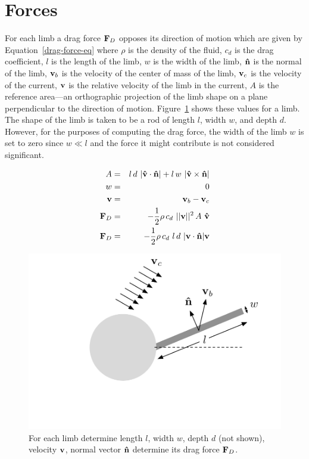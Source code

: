 \section{Forces}

For each limb a drag force $\mathbf{F}_D$ opposes its direction of motion
which are given by Equation~\ref{drag-force-eq} where $\rho$ is the
density of the fluid, $c_d$ is the drag coefficient, $l$ is the length
of the limb, $w$ is the width of the limb, $\mathbf{\hat{n}}$ is the normal of
the limb, $\mathbf{v}_b$ is the velocity of the center of mass of the limb,
$\mathbf{v}_c$ is the velocity of the current, $\mathbf{v}$ is the relative
velocity of the limb in the current, $A$ is the reference area---an
orthographic projection of the limb shape on a plane perpendicular to
the direction of motion.  Figure~\ref{drag-force} shows these values
for a limb.  The shape of the limb is taken to be a rod of length $l$,
width $w$, and depth $d$.  However, for the purposes of computing the
drag force, the width of the limb $w$ is set to zero since $w \ll l$
and the force it might contribute is not considered significant.

\begin{eqnarray}
  A &=& l\,d~ |\mathbf{\hat{v}} \cdot \mathbf{\hat{n}}| + l\, w~|\mathbf{\hat{v}} \times \mathbf{\hat{n}}|\\
  w &=& 0 \\
  \mathbf{v} &=& \mathbf{v}_b - \mathbf{v}_c \\
  \mathbf{F}_D &=& -\frac{1}{2} \rho\,c_d~||\mathbf{v}||^2\,A~\mathbf{\hat{v}} \\
  \mathbf{F}_D &=& -\frac{1}{2} \rho\, c_d~ l\,d~|\mathbf{v} \cdot \mathbf{\hat{n}}|\mathbf{v} \label{drag-force-eq} 
\end{eqnarray}


\begin{figure}[h]  
  \centering
  \includegraphics[scale=0.7]{fig/drag-force.pdf} 
  \vspace{-45pt}
  \caption[Diagram of drag force]{\label{drag-force}For each limb determine
    length $l$, width $w$, depth $d$ (not shown), velocity $\mathbf{v} $,
    normal vector $\mathbf{\hat{n}}$ determine its drag force $\mathbf{F}_D$.}
\end{figure}

